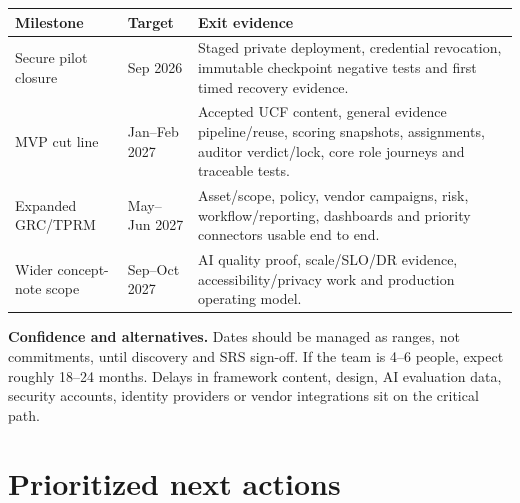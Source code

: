 \documentclass[11pt,a4paper]{article}
\begin{document}
\begin{center}
\end{center}

\begin{center}
\begin{tabularx}{\textwidth}{p{}p{}X}
\toprule
Milestone & Target & Exit evidence \\
\midrule
Secure pilot closure & Sep 2026 & Staged private deployment, credential revocation, immutable checkpoint negative tests and first timed recovery evidence. \\
MVP cut line & Jan--Feb 2027 & Accepted UCF content, general evidence pipeline/reuse, scoring snapshots, assignments, auditor verdict/lock, core role journeys and traceable tests. \\
Expanded GRC/TPRM & May--Jun 2027 & Asset/scope, policy, vendor campaigns, risk, workflow/reporting, dashboards and priority connectors usable end to end. \\
Wider concept-note scope & Sep--Oct 2027 & AI quality proof, scale/SLO/DR evidence, accessibility/privacy work and production operating model. \\
\bottomrule
\end{tabularx}
\end{center}

\textbf{Confidence and alternatives.} Dates should be managed as ranges, not
commitments, until discovery and SRS sign-off. If the team is 4--6 people, expect
roughly 18--24 months. Delays in framework content, design, AI evaluation data,
security accounts, identity providers or vendor integrations sit on the critical
path.

\section{Prioritized next actions}
\end{document}
